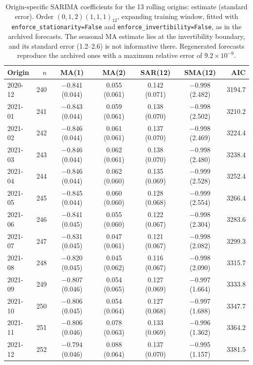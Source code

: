 \documentclass[pdflatex,sn-mathphys-ay,lineno]{sn-jnl}
\begin{document}
\begin{appendices}
\begin{table}[htbp]
\centering
\scriptsize
\caption{Origin-specific SARIMA coefficients for the 13 rolling origins: estimate (standard error). Order $(0,1,2)(1,1,1)_{12}$, expanding training window, fitted with \texttt{enforce\_stationarity=False} and \texttt{enforce\_invertibility=False}, as in the archived forecasts. The seasonal MA estimate lies at the invertibility boundary, and its standard error (1.2--2.6) is not informative there. Regenerated forecasts reproduce the archived ones with a maximum relative error of $9.2\times10^{-9}$.}
\label{tab:sarima}
\begingroup\setlength{\tabcolsep}{3pt}
\begin{tabular}{@{}lrccccr@{}}
\toprule
Origin & $n$ & MA(1) & MA(2) & SAR(12) & SMA(12) & AIC \\
\midrule
2020-12 & 240 & $-$0.841 (0.044) & 0.055 (0.061) & 0.142 (0.071) & $-$0.998 (2.482) & 3194.7 \\
2021-01 & 241 & $-$0.843 (0.044) & 0.059 (0.061) & 0.138 (0.070) & $-$0.998 (2.502) & 3210.2 \\
2021-02 & 242 & $-$0.846 (0.044) & 0.061 (0.061) & 0.137 (0.070) & $-$0.998 (2.469) & 3224.4 \\
2021-03 & 243 & $-$0.846 (0.044) & 0.062 (0.061) & 0.138 (0.070) & $-$0.998 (2.480) & 3238.4 \\
2021-04 & 244 & $-$0.846 (0.044) & 0.062 (0.060) & 0.135 (0.069) & $-$0.999 (2.528) & 3252.4 \\
2021-05 & 245 & $-$0.845 (0.044) & 0.060 (0.060) & 0.128 (0.068) & $-$0.999 (2.554) & 3266.4 \\
2021-06 & 246 & $-$0.841 (0.045) & 0.055 (0.060) & 0.122 (0.067) & $-$0.998 (2.304) & 3283.6 \\
2021-07 & 247 & $-$0.831 (0.045) & 0.047 (0.061) & 0.121 (0.067) & $-$0.998 (2.082) & 3299.3 \\
2021-08 & 248 & $-$0.820 (0.045) & 0.045 (0.062) & 0.116 (0.067) & $-$0.998 (2.090) & 3315.7 \\
2021-09 & 249 & $-$0.807 (0.046) & 0.054 (0.065) & 0.127 (0.069) & $-$0.997 (1.664) & 3333.8 \\
2021-10 & 250 & $-$0.806 (0.045) & 0.054 (0.064) & 0.127 (0.068) & $-$0.997 (1.688) & 3347.7 \\
2021-11 & 251 & $-$0.806 (0.046) & 0.078 (0.063) & 0.133 (0.069) & $-$0.996 (1.362) & 3364.2 \\
2021-12 & 252 & $-$0.794 (0.046) & 0.088 (0.064) & 0.137 (0.070) & $-$0.995 (1.157) & 3381.5 \\
\bottomrule
\end{tabular}
\endgroup
\end{table}

\end{appendices}
\end{document}
